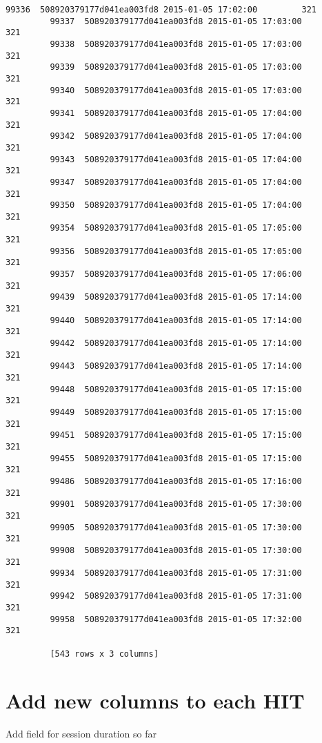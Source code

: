 \documentclass[11pt]{article}
\begin{document}
\begin{Verbatim}[commandchars=\\\{\}]
         99336  508920379177d041ea003fd8 2015-01-05 17:02:00         321
         99337  508920379177d041ea003fd8 2015-01-05 17:03:00         321
         99338  508920379177d041ea003fd8 2015-01-05 17:03:00         321
         99339  508920379177d041ea003fd8 2015-01-05 17:03:00         321
         99340  508920379177d041ea003fd8 2015-01-05 17:03:00         321
         99341  508920379177d041ea003fd8 2015-01-05 17:04:00         321
         99342  508920379177d041ea003fd8 2015-01-05 17:04:00         321
         99343  508920379177d041ea003fd8 2015-01-05 17:04:00         321
         99347  508920379177d041ea003fd8 2015-01-05 17:04:00         321
         99350  508920379177d041ea003fd8 2015-01-05 17:04:00         321
         99354  508920379177d041ea003fd8 2015-01-05 17:05:00         321
         99356  508920379177d041ea003fd8 2015-01-05 17:05:00         321
         99357  508920379177d041ea003fd8 2015-01-05 17:06:00         321
         99439  508920379177d041ea003fd8 2015-01-05 17:14:00         321
         99440  508920379177d041ea003fd8 2015-01-05 17:14:00         321
         99442  508920379177d041ea003fd8 2015-01-05 17:14:00         321
         99443  508920379177d041ea003fd8 2015-01-05 17:14:00         321
         99448  508920379177d041ea003fd8 2015-01-05 17:15:00         321
         99449  508920379177d041ea003fd8 2015-01-05 17:15:00         321
         99451  508920379177d041ea003fd8 2015-01-05 17:15:00         321
         99455  508920379177d041ea003fd8 2015-01-05 17:15:00         321
         99486  508920379177d041ea003fd8 2015-01-05 17:16:00         321
         99901  508920379177d041ea003fd8 2015-01-05 17:30:00         321
         99905  508920379177d041ea003fd8 2015-01-05 17:30:00         321
         99908  508920379177d041ea003fd8 2015-01-05 17:30:00         321
         99934  508920379177d041ea003fd8 2015-01-05 17:31:00         321
         99942  508920379177d041ea003fd8 2015-01-05 17:31:00         321
         99958  508920379177d041ea003fd8 2015-01-05 17:32:00         321
         
         [543 rows x 3 columns]
\end{Verbatim}
            
    \hypertarget{add-new-columns-to-each-hit}{%
\section{Add new columns to each
HIT}\label{add-new-columns-to-each-hit}}

    Add field for session duration so far
\end{document}
